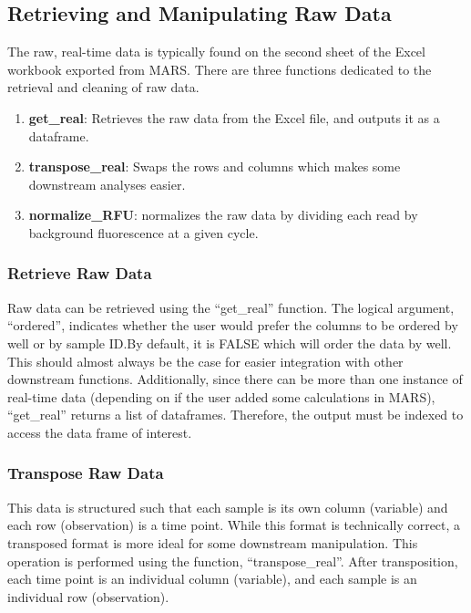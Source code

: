 \documentclass[preprint,12pt, a4paper]{elsarticle}
\begin{document}
    \subsection{Retrieving and Manipulating Raw Data}
        The raw, real-time data is typically found on the second sheet of the Excel workbook exported from MARS. There are three functions dedicated to the retrieval and cleaning of raw data.

    \begin{enumerate}
        \item \textbf{get\_real}: Retrieves the raw data from the Excel file, and outputs it as a dataframe.
        \item \textbf{transpose\_real}: Swaps the rows and columns which makes some downstream analyses easier.
        \item \textbf{normalize\_RFU}: normalizes the raw data by dividing each read by background fluorescence at a given cycle.
    \end{enumerate}

        \subsubsection{Retrieve Raw Data}
            Raw data can be retrieved using the ``get\_real'' function. The logical argument, ``ordered'', indicates whether the user would prefer the columns to be ordered by well or by sample ID.\@ By default, it is FALSE which will order the data by well. This should almost always be the case for easier integration with other downstream functions. Additionally, since there can be more than one instance of real-time data (depending on if the user added some calculations in MARS), ``get\_real'' returns a list of dataframes. Therefore, the output must be indexed to access the data frame of interest.

        \subsubsection{Transpose Raw Data}
            This data is structured such that each sample is its own column (variable) and each row (observation) is a time point. While this format is technically correct, a transposed format is more ideal for some downstream manipulation. This operation is performed using the function, ``transpose\_real''. After transposition, each time point is an individual column (variable), and each sample is an individual row (observation).
\end{document}
